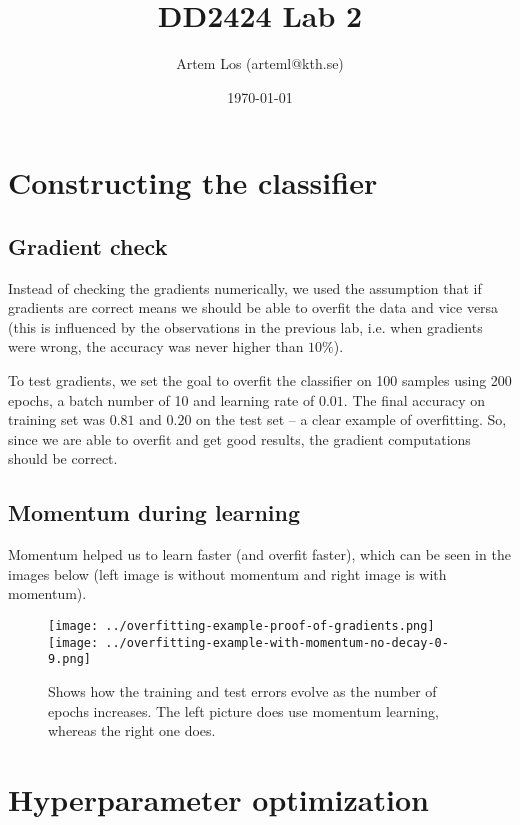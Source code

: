 \documentclass[10pt,a4paper]{article}
\title{DD2424 Lab 2}
\author{Artem Los (arteml@kth.se)}
\date{\today}
\begin{document}
\maketitle

\section*{Constructing the classifier}

\subsection*{Gradient check}
Instead of checking the gradients numerically, we used the assumption that if gradients are correct means we should be able to overfit the data and vice versa (this is influenced by the observations in the previous lab, i.e. when gradients were wrong, the accuracy was never higher than $10\%$).

To test gradients, we set the goal to overfit the classifier on 100 samples using 200 epochs, a batch number of 10 and learning rate of $0.01$. The final accuracy on training set was $0.81$ and $0.20$ on the test set -- a clear example of overfitting. So, since we are able to overfit and get good results, the gradient computations should be correct.

\subsection*{Momentum during learning}
Momentum helped us to learn faster (and overfit faster), which can be seen in the images below (left image is without momentum and right image is with momentum). 

\begin{figure}[H]
	\texttt{[image: ../overfitting-example-proof-of-gradients.png]}
	\texttt{[image: ../overfitting-example-with-momentum-no-decay-0-9.png]}
	\caption{Shows how the training and test errors evolve as the number of epochs increases. The left picture does use momentum learning, whereas the right one does.}
\end{figure}

\section*{Hyperparameter optimization}
\end{document}
